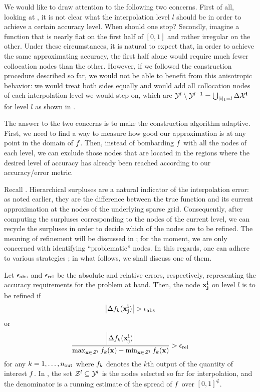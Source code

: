 We would like to draw attention to the following two concerns. First of all,
looking at , it is not clear what the interpolation
level $l$ should be in order to achieve a certain accuracy level. When should
one stop? Secondly, imagine a function that is nearly flat on the first half of
$[0, 1]$ and rather irregular on the other. Under these circumstances, it is
natural to expect that, in order to achieve the same approximating accuracy, the
first half alone would require much fewer collocation nodes than the other.
However, if we followed the construction procedure described so far, we would
not be able to benefit from this anisotropic behavior: we would treat both sides
equally and would add all collocation nodes of each interpolation level we would
step on, which are $\mathcal{Y}^l \setminus \mathcal{Y}^{l - 1} = \bigcup_{|\mathbf{i}|_1 = l}
\Delta\mathcal{X}^{\mathbf{i}}$ for level $l$ as shown in .

The answer to the two concerns is to make the construction algorithm adaptive.
First, we need to find a way to measure how good our approximation is at any
point in the domain of $f$. Then, instead of bombarding $f$ with all the nodes
of each level, we can exclude those nodes that are located in the regions where
the desired level of accuracy has already been reached according to our
accuracy/error metric.

Recall . Hierarchical surpluses are a natural indicator
of the interpolation error: as noted earlier, they are the difference between
the true function and its current approximation at the nodes of the underlying
sparse grid. Consequently, after computing the surpluses corresponding to the
nodes of the current level, we can recycle the surpluses in order to decide
which of the nodes are to be refined. The meaning of refinement will be
discussed in ; for the moment, we are only concerned
with identifying ``problematic'' nodes. In this regards, one can adhere to
various strategies \cite{ma2009}; in what follows, we shall discuss one of them.

Let $\epsilon_{\text{abs}}$ and $\epsilon_{\text{rel}}$ be the absolute and relative
errors, respectively, representing the accuracy requirements for the problem at
hand. Then, the node $\mathbf{x}^{\mathbf{i}}_{\mathbf{j}}$ on level $l$ is to be refined if
\begin{equation} \elab{absolute-error}
  \left| \surplus_k(\vx^\vi_\vj) \right| > \error_\absolute
\end{equation}
or
\begin{equation} \elab{relative-error}
  \frac{\left| \surplus_k(\vx^\vi_\vj) \right|}{\max_{\vx \in \Z^l} \f_k(\vx) - \min_{\vx \in \Z^l} \f_k(\vx)} > \error_\relative
\end{equation}
for any $k = 1, \dots, {n_\text{out}}$ where $f_k$ denotes the $k$th output of the
quantity of interest $f$. In , the set $\mathcal{Z}^l \subseteq
\mathcal{Y}^l$ is the nodes selected so far for interpolation, and the denominator is a
running estimate of the spread of $f$ over $[0, 1]^\nin$.

